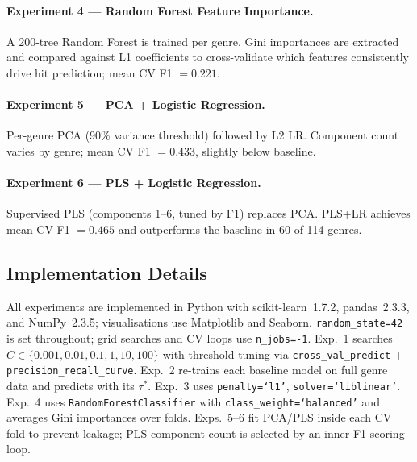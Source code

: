 \paragraph{Experiment 4 — Random Forest Feature Importance.}
A 200-tree Random Forest is trained per genre. Gini importances are extracted and compared against L1 coefficients to cross-validate which features consistently drive hit prediction; mean CV F1 $= 0.221$.

\paragraph{Experiment 5 — PCA + Logistic Regression.}
Per-genre PCA (90\% variance threshold) followed by L2 LR. Component count varies by genre; mean CV F1 $= 0.433$, slightly below baseline.

\paragraph{Experiment 6 — PLS + Logistic Regression.}
Supervised PLS (components 1--6, tuned by F1) replaces PCA. PLS+LR achieves mean CV F1 $= 0.465$ and outperforms the baseline in 60 of 114 genres.

\subsection{Implementation Details}

All experiments are implemented in Python with scikit-learn~1.7.2, pandas~2.3.3, and NumPy~2.3.5; visualisations use Matplotlib and Seaborn. \texttt{random\_state=42} is set throughout; grid searches and CV loops use \texttt{n\_jobs=-1}. Exp.~1 searches $C \in \{0.001, 0.01, 0.1, 1, 10, 100\}$ with threshold tuning via \texttt{cross\_val\_predict} + \texttt{precision\_recall\_curve}. Exp.~2 re-trains each baseline model on full genre data and predicts with its $\tau^*$. Exp.~3 uses \texttt{penalty=`l1'}, \texttt{solver=`liblinear'}. Exp.~4 uses \texttt{RandomForestClassifier} with \texttt{class\_weight=`balanced'} and averages Gini importances over folds. Exps.~5--6 fit PCA/PLS inside each CV fold to prevent leakage; PLS component count is selected by an inner F1-scoring loop.
